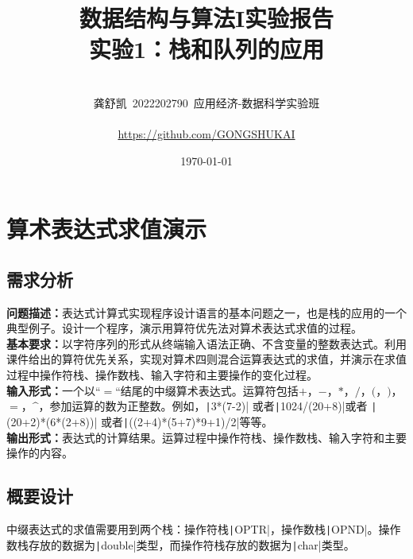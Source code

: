 \documentclass[10pt,a4paper]{article}
\begin{document}
	\title{{\Huge 数据结构与算法I实验报告{\large\linebreak\\}}{\huge 实验1：栈和队列的应用\linebreak\linebreak}}
	\vspace{3cm}
	\author{\\ \Large 龚舒凯\ 2022202790\ 应用经济-数据科学实验班\\
		\hfill\\
		\Large{\url{https://github.com/GONGSHUKAI}}\\
		\hfill}
	
	\date{\today}
	\maketitle
	\newpage
	\section{算术表达式求值演示}
	\subsection{需求分析}
	\noindent \textbf{问题描述：}表达式计算式实现程序设计语言的基本问题之一，也是栈的应用的一个典型例子。设计一个程序，演示用算符优先法对算术表达式求值的过程。\\
	
	\noindent \textbf{基本要求：}以字符序列的形式从终端输入语法正确、不含变量的整数表达式。利用课件给出的算符优先关系，实现对算术四则混合运算表达式的求值，并演示在求值过程中操作符栈、操作数栈、输入字符和主要操作的变化过程。\\
	
	\noindent \textbf{输入形式：}一个以“$=$“结尾的中缀算术表达式。运算符包括$+$，$-$，$*$，$/$，$($，$)$，$=$，$\^$，参加运算的数为正整数。例如，\texttt|3*(7-2)| 或者\texttt|1024/(20+8)|或者 \texttt|(20+2)*(6*(2+8))| 或者\texttt|((2+4)*(5+7)*9+1)/2|等等。\\
	
	\noindent \textbf{输出形式：}表达式的计算结果。运算过程中操作符栈、操作数栈、输入字符和主要操作的内容。
	\subsection{概要设计}
	\noindent 中缀表达式的求值需要用到两个栈：操作符栈\texttt|OPTR|，操作数栈\texttt|OPND|。操作数栈存放的数据为\texttt|double|类型，而操作符栈存放的数据为\texttt|char|类型。
\end{document}
